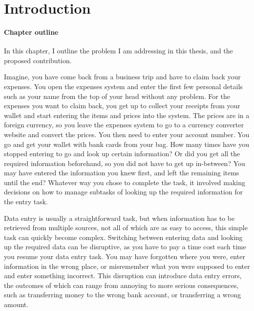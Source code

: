 \documentclass[11pt,oneside]{report}
\begin{document}
\fboxsep=10pt
\fboxrule=0.5pt

\tableofcontents
\listoffigures
\listoftables
\chapter{Introduction}

\begin{mynote}
\subsubsection{Chapter outline}
In this chapter, I outline the problem I am addressing in this thesis, and the proposed contribution.
\end{mynote}

\vspace{10pt}
 
Imagine, you have come back from a business trip and have to claim back your expenses. You open the expenses system and enter the first few personal details such as your name from the top of your head without any problem. For the expenses you want to claim back, you get up to collect your receipts from your wallet and start entering the items and prices into the system. The prices are in a foreign currency, so you leave the expenses system to go to a currency converter website and convert the prices. You then need to enter your account number. You go and get your wallet with bank cards from your bag. How many times have you stopped entering to go and look up certain information? Or did you get all the required information beforehand, so you did not have to get up in-between? You may have entered the information you knew first, and left the remaining items until the end? Whatever way you chose to complete the task, it involved making decisions on how to manage subtasks of looking up the required information for the entry task. 

Data entry is usually a straightforward task, but when information has to be retrieved from multiple sources, not all of which are as easy to access, this simple task can quickly become complex. Switching between entering data and looking up the required data can be disruptive, as you have to pay a time cost 
each time you resume your data entry task. You may have forgotten where you were, enter information in the wrong place, or misremember what you were supposed to enter and enter something incorrect. This disruption can introduce data entry errors, the outcomes of which can range from annoying to more serious consequences, such as transferring money to the wrong bank account, or transferring a wrong amount.  
\end{document}
